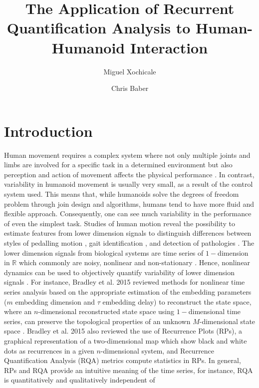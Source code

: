 \documentclass[fleqn,10pt]{wlscirep}
\title{The Application of Recurrent Quantification Analysis 
to Human-Humanoid Interaction}
\author[1,*]{Miguel Xochicale}
\author[1]{Chris Baber}
\affil[1]{University of Birmingham, 
	School of Engineering, 
	Birmingham, 
	B15 2TT, 
	UK}
\affil[*]{map479@bham.ac.uk}
\begin{document}
\flushbottom
\maketitle
\thispagestyle{empty}


\section*{Introduction}
Human movement requires a complex system where not only multiple
joints and limbs are involved for a specific task in a determined environment
but also perception and action of movement affects the physical performance 
\cite{davids2003}. 
In contrast, variability in humanoid movement is usually very small,
as a result of the control system used. This means that, while humanoids 
solve the degrees of freedom problem through join design and algorithms,
humans tend to have more fluid and flexible approach. Consequently, 
one can see much variability in the performance of even the simplest task.
Studies of human motion reveal the possibility to 
estimate features from lower dimension signals to distinguish differences between 
styles of pedalling motion \cite{Quintana-Duque2012, Quintana-Duque2016}, 
gait identification \cite{sama2013, frank2010},
and detection of pathologies \cite{gomezgarcia2014}.
The lower dimension signals from biological systems are time series 
of $1-$dimension in $\mathbb{R}$ which commonly are 
noisy, nonlinear and non-stationary \cite{gomezgarcia2014}.
Hence, nonlinear dynamics can be used to 
objectively quantify variability of lower
dimension signals \cite{Quintana-Duque2012, Quintana-Duque2016, sama2013, 
frank2010, gomezgarcia2014, marwan2011, stergiou2011}.
For instance, Bradley et al. 2015 \cite{bradley2015} reviewed methods for
nonlinear time series analysis based on the appropriate estimation of the 
embedding parameters ($m$ embedding dimension and $\tau$ embedding delay) to 
reconstruct the state space,
where an $n$-dimensional reconstructed state space using $1-$dimensional 
time series,
can preserve the topological properties of an unknown $M$-dimensional 
state space \cite{takens1981}.
Bradley et al. 2015 \cite{bradley2015} also reviewed the use of 
Recurrence Plots (RPs), a graphical representation of a two-dimensional map 
which show black and white dots as recurrences in a given $n$-dimensional system, 
and Recurrence Quantification Analysis (RQA) metrics compute statistics in RPs.
In general, RPs and RQA provide an intuitive meaning of the time series,
for instance, RQA is quantitatively and qualitatively independent of 
\end{document}
